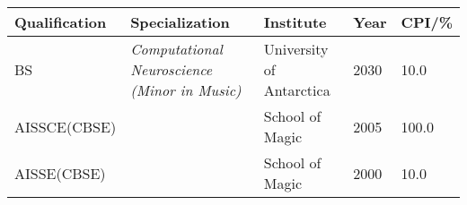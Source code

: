 
\begin{tabular}{ p{2.5cm} @{\hskip 0.1in} p{6.8cm} @{\hskip 0.1in} p{6.2cm} @{\hskip 0.3in} p{1.2cm} @{\hskip 0.1in} p{1cm}}
\textbf{Qualification} & \textbf{Specialization} & \textbf{Institute} & \textbf{Year} & \textbf{CPI/\%} \\
\midrule
BS & \textit{\color{venue} Computational Neuroscience (Minor in Music) } & University of Antarctica & 2030 & 10.0 \\
AISSCE(CBSE) &  & School of Magic & 2005 & 100.0 \\
AISSE(CBSE) &  & School of Magic & 2000 & 10.0\\
\end{tabular}